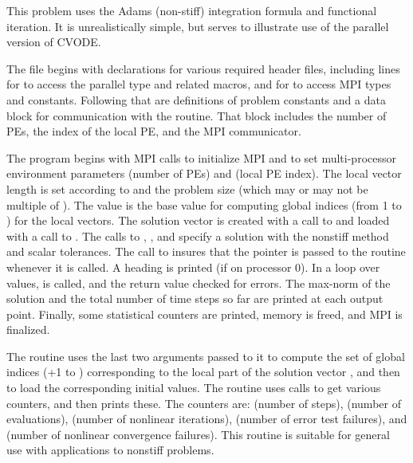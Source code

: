 This problem uses the Adams (non-stiff) integration formula and functional
iteration.  It is unrealistically simple, but serves to illustrate
use of the parallel version of CVODE.

The  file begins with  declarations for
various required header files, including lines for
 to access the parallel  type and related
macros, and for  to access MPI types and constants. Following
that are definitions of problem constants and a data block for communication
with the  routine.  That block includes the number of PEs, the index
of the local PE, and the MPI communicator.

The  program begins with MPI calls to initialize MPI and to set
multi-processor environment parameters  (number of PEs) and
 (local PE index).  The local vector length is set according
to  and the problem size  (which may or may not be
multiple of ).  The value  is the base value for
computing global indices (from 1 to ) for the local vectors.
The solution vector  is created with a call to 
and loaded with a call to .  The calls to ,
, and  specify a {\cvode} solution with
the nonstiff method and scalar tolerances.  The call to 
insures that the pointer  is passed to the  routine whenever it
is called.
A heading is printed (if on processor 0).  In a loop over  values,
 is called, and the return value checked for errors.  The
max-norm of the solution and the total number of time steps so far
are printed at each output point.  Finally, some statistical counters are
printed, memory is freed, and MPI is finalized.

The  routine uses the last two arguments passed to it to compute
the set of global indices (+1 to )
corresponding to the local part of the solution vector , and then to
load the corresponding initial values.  The  routine
uses  calls to get various counters, and then prints these.
The counters are:  (number of steps),  (number of
 evaluations),  (number of nonlinear iterations),
 (number of error test failures), and  (number of
nonlinear convergence failures).  This routine is suitable for general use
with {\cvode} applications to nonstiff problems.

